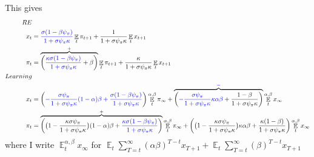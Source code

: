 \documentclass[11pt]{article}
\renewcommand{\[}{\begin{equation}}
\renewcommand{\]}{\end{equation}}
\DeclareMathOperator{\E}{\mathbb{E}}
\begin{document}
This gives
\begin{align*}
RE& \\
x_t &=  \textcolor{blue}{ \frac{\sigma(1-\beta\psi_{\pi})}{1+\sigma\psi_{\pi}\kappa}}\E_t \pi_{t+1}   +   \frac{1}{1+\sigma\psi_{\pi}\kappa}\E_t x_{t+1}  \\
\pi_t &=   \overbrace{\bigg( \textcolor{blue}{\frac{\kappa\sigma(1-\beta\psi_{\pi})}{1+\sigma\psi_{\pi}\kappa}}+\beta\bigg)}^{+}\E_t \pi_{t+1} +   \frac{\kappa}{1+\sigma\psi_{\pi}\kappa}\E_t x_{t+1} \\
Learning & \\
x_t & =  \bigg( \textcolor{blue}{-\frac{\sigma\psi_{\pi}}{1+\sigma\psi_{\pi}\kappa}(1-\alpha)\beta + \frac{\sigma(1-\beta\psi_{\pi})}{1+\sigma\psi_{\pi}\kappa}}\bigg) \E^{\alpha,\beta}_t \pi_{\infty} 
+\overbrace{\bigg( \textcolor{blue}{-\frac{\sigma\psi_{\pi}}{1+\sigma\psi_{\pi}\kappa}\kappa\alpha\beta} + \frac{1-\beta}{1+\sigma\psi_{\pi}\kappa}\bigg)}^{\textcolor{blue}{-}} \E^{\alpha,\beta}_t x_{\infty} \\
\pi_t & =  \overbrace{\bigg( \big(1-\frac{\kappa\sigma\psi_{\pi}}{1+\sigma\psi_{\pi}\kappa} \big)(1-\alpha)\beta + \textcolor{blue}{\frac{\kappa\sigma(1-\beta\psi_{\pi})}{1+\sigma\psi_{\pi}\kappa}}\bigg)}^{+}  \E^{\alpha,\beta}_t \pi_{\infty} 
+\bigg(   \big(1-\frac{\kappa\sigma\psi_{\pi}}{1+\sigma\psi_{\pi}\kappa} \big) \kappa\alpha\beta + \frac{\kappa(1-\beta)}{1+\sigma\psi_{\pi}\kappa}\bigg)\E^{\alpha,\beta}_t x_{\infty} 
\end{align*}
where I write $\E^{\alpha,\beta}_t x_{\infty}$ for $\E_t\sum_{T=t}^{\infty} (\alpha\beta)^{T-t}x_{T+1} + \E_t\sum_{T=t}^{\infty} (\beta)^{T-t} x_{T+1}$

\newpage
\end{document}
